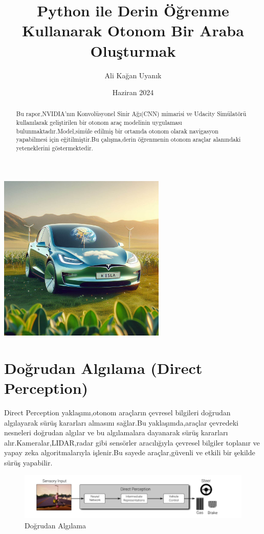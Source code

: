 \documentclass{article}
\title{Python ile Derin Öğrenme Kullanarak Otonom Bir Araba Oluşturmak}
\author{Ali Kağan Uyanık}
\date{Haziran 2024}
\begin{document}
\begin{titlingpage}
    \maketitle
    \begin{center}
        \includegraphics[width=0.6\textwidth]{image/otomobil.jpg} %
    \end{center}
    \vfill
    
    \renewcommand{\abstractname}{Özet}
    \begin{abstract}
        \noindent Bu rapor,NVIDIA'nın Konvolüsyonel Sinir Ağı(CNN) mimarisi ve Udacity Simülatörü kullanılarak geliştirilen bir otonom araç modelinin uygulaması bulunmaktadır.Model,simüle edilmiş bir ortamda otonom olarak navigasyon yapabilmesi için eğitilmiştir.Bu çalışma,derin öğrenmenin otonom araçlar alanındaki yeteneklerini göstermektedir.
    \end{abstract}
    
    \vfill
\end{titlingpage}
\newpage

\section{Doğrudan Algılama (Direct Perception)}
Direct Perception yaklaşımı,otonom araçların çevresel bilgileri doğrudan algılayarak sürüş kararları almasını sağlar.Bu yaklaşımda,araçlar çevredeki nesneleri doğrudan algılar ve bu algılamalara dayanarak sürüş kararları alır.Kameralar,LIDAR,radar gibi sensörler aracılığıyla çevresel bilgiler toplanır ve yapay zeka algoritmalarıyla işlenir.Bu sayede araçlar,güvenli ve etkili bir şekilde sürüş yapabilir.

\begin{figure}[h]
  \centering
  \includegraphics[width=1.1\textwidth]{image/Resim59.PNG} %
\caption{Doğrudan Algılama \cite{Imitation}}
  \label{fig:cnnmimari}  
\end{figure}
\end{document}
